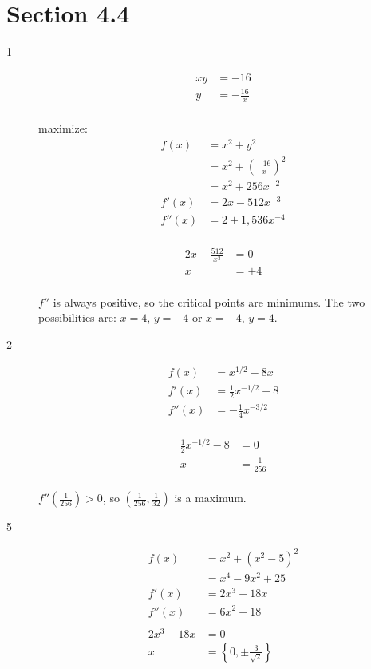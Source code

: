 \documentclass[fleqn]{exam}
\begin{document}
\section{Section 4.4}

\begin{description}

\item[1]
\begin{align*}
  xy &= -16 \\
  y  &= - \frac{16}{x} \\
\end{align*}

maximize:
\begin{align*}
  f(x) &= x^2 + y^2 \\
       &= x^2 + \left( \frac{-16}{x} \right)^2 \\
       &= x^2 + 256 x^{-2} \\
  f'(x) &= 2x - 512 x^{-3} \\
  f''(x) &= 2 + 1,536 x^{-4} \\  
\end{align*}

\begin{align*}
  2x - \frac{512}{x^3} &= 0 \\
  x &= \pm 4 \\
\end{align*}

$f''$ is always positive, so the critical points are minimums.  The two possibilities are: $x = 4$, $y = -4$ or $x = -4$, $y = 4$.

\item[2]
\begin{align*}
  f(x)   &= x^{1/2} - 8x \\
  f'(x)  &= \frac{1}{2}x^{-1/2} - 8 \\
  f''(x) &= - \frac{1}{4}x^{-3/2} \\  
\end{align*}

\begin{align*}
  \frac{1}{2}x^{-1/2} - 8 &= 0 \\
  x &= \frac{1}{256} \\
\end{align*}

$f''\left(\frac{1}{256} \right) > 0$, so $\left( \frac{1}{256}, \frac{1}{32} \right)$ is a maximum.

\item[5]
\begin{align*}
  f(x)   &= x^2 + (x^2 - 5)^2 \\
         &= x^4 - 9x^2 + 25 \\
  f'(x)  &= 2x^3 - 18x \\
  f''(x) &= 6x^2 - 18 \\  
\\
  2x^3 - 18x &= 0 \\
  x &= \left \{ 0, \pm \frac{3}{\sqrt{2}} \right \} \\
\end{align*}


\end{description}
\end{document}
